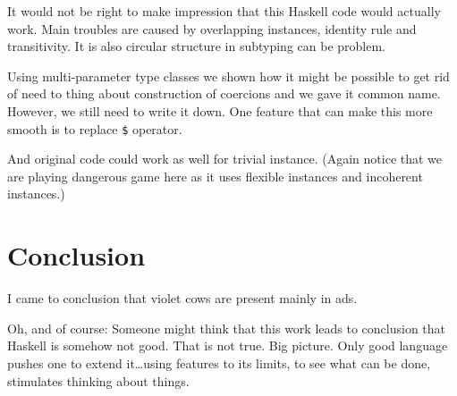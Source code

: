 \documentclass[11pt,oneside,draft]{fithesis2}
\newcommand\uv[1]{``#1''}
\theoremstyle{definition}
\begin{document}
It would not be right to make impression that this Haskell code
would actually work. Main troubles are caused by overlapping instances,
identity rule and transitivity. It is also circular structure in subtyping
can be problem.

Using multi-parameter type classes we shown how it might be possible to
get rid of need to thing about construction of coercions and we gave
it common name. However, we still need to write it down. One feature
that can make this more smooth is to replace \texttt{\$} operator.
\begin{comment}
$
\end{comment}
And original code could work as well for trivial instance.
(Again notice that we are playing dangerous game here as it uses
flexible instances and incoherent instances.)

%



\chapter{Conclusion}

I came to conclusion that violet cows are present mainly in ads.

Oh, and of course:
Someone might think that this work leads to conclusion that Haskell is somehow not good.
That is not true. Big picture. Only good language pushes one to extend it\dots using features
to its limits, to see what can be done, stimulates thinking about things.

\clearpage
{}
%


\end{document}
